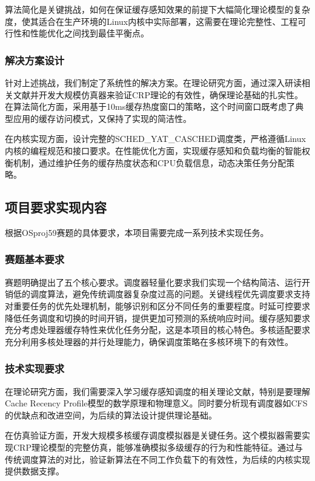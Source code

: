 算法简化是关键挑战，如何在保证缓存感知效果的前提下大幅简化理论模型的复杂度，使其适合在生产环境的Linux内核中实际部署，这需要在理论完整性、工程可行性和性能优化之间找到最佳平衡点。

\subsubsection{解决方案设计}

针对上述挑战，我们制定了系统性的解决方案。在理论研究方面，通过深入研读相关文献并开发大规模仿真器来验证CRP理论的有效性，确保理论基础的扎实性。在算法简化方面，采用基于10ms缓存热度窗口的策略，这个时间窗口既考虑了典型应用的缓存访问模式，又保持了实现的简洁性。

在内核实现方面，设计完整的SCHED\_YAT\_CASCHED调度类，严格遵循Linux内核的编程规范和接口要求。在性能优化方面，实现缓存感知和负载均衡的智能权衡机制，通过维护任务的缓存热度状态和CPU负载信息，动态决策任务分配策略。

\subsection{项目要求实现内容}

根据OSproj59赛题的具体要求，本项目需要完成一系列技术实现任务。

\subsubsection{赛题基本要求}

赛题明确提出了五个核心要求。调度器轻量化要求我们实现一个结构简洁、运行开销低的调度算法，避免传统调度器复杂度过高的问题。关键线程优先调度要求支持对重要任务的优先处理机制，能够识别和区分不同任务的重要程度。时延可控要求降低任务调度和切换的时间开销，提供更加可预测的系统响应时间。缓存感知要求充分考虑处理器缓存特性来优化任务分配，这是本项目的核心特色。多核适配要求充分利用多核处理器的并行处理能力，确保调度策略在多核环境下的有效性。

\subsubsection{技术实现要求}

在理论研究方面，我们需要深入学习缓存感知调度的相关理论文献，特别是要理解Cache Recency Profile模型的数学原理和物理意义。同时要分析现有调度器如CFS的优缺点和改进空间，为后续的算法设计提供理论基础。

在仿真验证方面，开发大规模多核缓存调度模拟器是关键任务。这个模拟器需要实现CRP理论模型的完整仿真，能够准确模拟多级缓存的行为和性能特征。通过与传统调度算法的对比，验证新算法在不同工作负载下的有效性，为后续的内核实现提供数据支撑。

